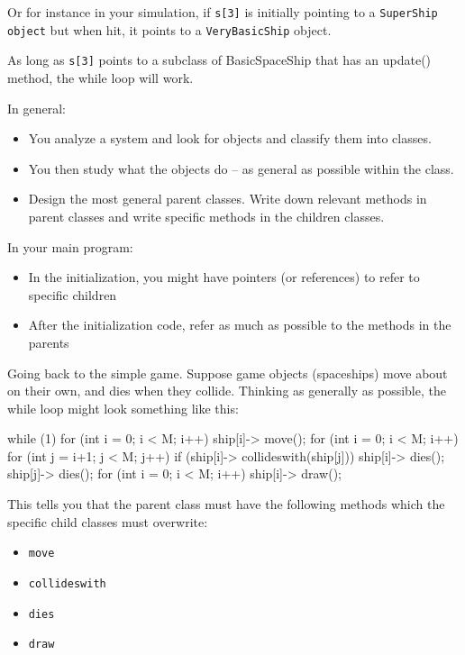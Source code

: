 Or for instance in your simulation, if \verb!s[3]! is initially pointing to a \verb!SuperShip object! but when hit, it points to a \verb!VeryBasicShip! object.

As long as \verb!s[3]! points to a subclass of BasicSpaceShip that has an update() method, the while loop will work.

In general:

\begin{itemize}
\item
  You analyze a system and look for objects and classify them into
  classes.
\item
  You then study what the objects do -- as general as possible within
  the class.
\item
  Design the most general parent classes. Write down relevant methods in
  parent classes and write specific methods in the children classes.
\end{itemize}

In your main program:

\begin{itemize}
\item
  In the initialization, you might have pointers (or references) to
  refer to specific children
\item
  After the initialization code, refer as much as possible to the
  methods in the parents
\end{itemize}

Going back to the simple game. Suppose game objects (spaceships) move about on their own, and dies when they collide. Thinking as generally as possible, the while loop might look something like this:

\begin{console}
while (1)
{   
    for (int i = 0; i < M; i++) ship[i]-> move();
    for (int i = 0; i < M; i++)
    {
        for (int j = i+1; j < M; j++)
        if (ship[i]-> collideswith(ship[j]))
        {   
            ship[i]-> dies();
            ship[j]-> dies();
        }
    }
    for (int i = 0; i < M; i++) ship[i]-> draw();
} 
\end{console}

This tells you that the parent class must have the following methods which the specific child classes must overwrite:

\begin{itemize}
\item
  \verb!move!
\item
  \verb!collideswith!
\item
  \verb!dies!
\item
  \verb!draw!
\end{itemize}

